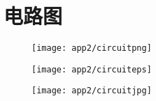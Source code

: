 
\chapter{电路图}
\label{app:circuit}
\begin{figure}[!p]
  \centering
  \texttt{[image: app2/circuitpng]}
\end{figure}
\begin{figure}[!p]
  \centering
  \texttt{[image: app2/circuiteps]}
\end{figure}
\begin{figure}[!p]
  \centering
  \texttt{[image: app2/circuitjpg]}
\end{figure}

